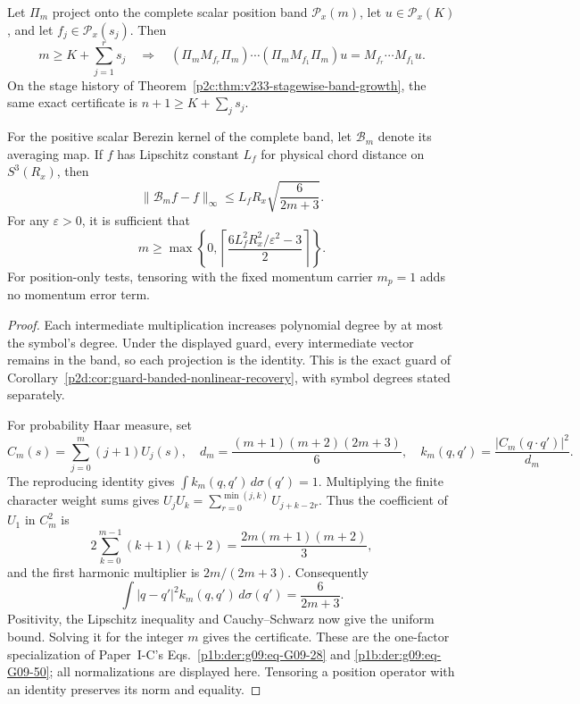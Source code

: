 \documentclass[12pt,a4paper]{article}
\begin{document}
\begin{theorem}
\label{p2d:thm:v233-recovery-certificates}
Let \(\Pi_m\) project onto the complete scalar position band
\(\mathcal P_x(m)\), let \(u\in\mathcal P_x(K)\), and let
\(f_j\in\mathcal P_x(s_j)\). Then
\[
 m\ge K+\sum_{j=1}^r s_j
 \quad\Longrightarrow\quad
 (\Pi_mM_{f_r}\Pi_m)\cdots(\Pi_mM_{f_1}\Pi_m)u
       =M_{f_r}\cdots M_{f_1}u .
\]
On the stage history of Theorem~\ref{p2c:thm:v233-stagewise-band-growth},
the same exact certificate is \(n+1\ge K+\sum_j s_j\).

For the positive scalar Berezin kernel of the complete band, let
\(\mathcal B_m\) denote its averaging map. If \(f\) has Lipschitz
constant \(L_f\) for physical chord distance on \(S^3(R_x)\), then
\[
 \|\mathcal B_m f-f\|_\infty
       \le L_fR_x\sqrt{\frac6{2m+3}}.
\]
For any \(\varepsilon>0\), it is sufficient that
\[
 m\ge
 \max\left\{0,\left\lceil
 \frac{6L_f^2R_x^2/\varepsilon^2-3}{2}
 \right\rceil\right\}.
\]
For position-only tests, tensoring with the fixed momentum carrier
\(m_p=1\) adds no momentum error term.
\end{theorem}
\begin{proof}
Each intermediate multiplication increases polynomial degree by
at most the symbol's degree. Under the displayed guard, every
intermediate vector remains in the band, so each projection is the
identity. This is the exact guard of
Corollary~\ref{p2d:cor:guard-banded-nonlinear-recovery}, with
symbol degrees stated separately.

For probability Haar measure, set
\[
 C_m(s)=\sum_{j=0}^m(j+1)U_j(s),\quad
 d_m=\frac{(m+1)(m+2)(2m+3)}6,\quad
 k_m(q,q')=\frac{|C_m(q\cdot q')|^2}{d_m}.
\]
The reproducing identity gives \(\int k_m(q,q')\,d\sigma(q')=1\).
Multiplying the finite character weight sums gives
\(U_jU_k=\sum_{r=0}^{\min(j,k)}U_{j+k-2r}\).
Thus the coefficient of \(U_1\) in \(C_m^2\) is
\[
 2\sum_{k=0}^{m-1}(k+1)(k+2)
       =\frac{2m(m+1)(m+2)}3,
\]
and the first harmonic multiplier is \(2m/(2m+3)\).
Consequently
\[
 \int|q-q'|^2 k_m(q,q')\,d\sigma(q')
        =\frac6{2m+3}.
\]
Positivity, the Lipschitz inequality and Cauchy--Schwarz now give
the uniform bound. Solving it for the integer \(m\) gives the
certificate. These are the one-factor specialization of Paper~I-C's
Eqs.~\eqref{p1b:der:g09:eq-G09-28} and
\eqref{p1b:der:g09:eq-G09-50}; all normalizations are displayed
here. Tensoring a position operator with an identity preserves
its norm and equality.
\end{proof}
\end{document}
